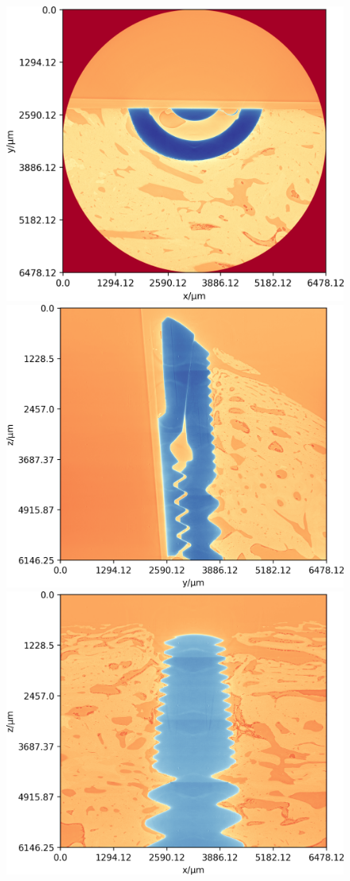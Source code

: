 \begin{figure}
\centering
\includegraphics[width=0.96\columnwidth]{figures/770c_pag-full-xy-1x.png}
\includegraphics[width=0.96\columnwidth]{figures/770c_pag-full-yz-1x.png}
\includegraphics[width=0.96\columnwidth]{figures/770c_pag-full-xz-1x.png}

\end{figure}
